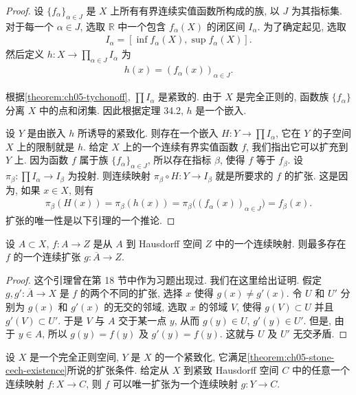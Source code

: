 \documentclass[../../main.tex]{subfiles}
\begin{document}
\begin{proof}
设 $\{f_\alpha\}_{\alpha\in J}$ 是 $X$ 上所有有界连续实值函数所构成的族, 以 $J$ 为其指标集. 对于每一个 $\alpha\in J$, 选取 $\mathbb{R}$ 中一个包含 $f_\alpha(X)$ 的闭区间 $I_\alpha$. 为了确定起见, 选取
\begin{align*}
I_\alpha=[\inf f_\alpha(X),\sup f_\alpha(X)].
\end{align*}
然后定义 $h\colon X\to\prod_{\alpha\in J}I_\alpha$ 为
\begin{align*}
h(x)=(f_\alpha(x))_{\alpha\in J}.
\end{align*}

根据\cref{theorem:ch05-tychonoff}, $\prod I_\alpha$ 是紧致的. 由于 $X$ 是完全正则的, 函数族 $\{f_\alpha\}$ 分离 $X$ 中的点和闭集. 因此根据定理 34.2, $h$ 是一个嵌入.

设 $Y$ 是由嵌入 $h$ 所诱导的紧致化. 则存在一个嵌入 $H\colon Y\to\prod I_\alpha$, 它在 $Y$ 的子空间 $X$ 上的限制就是 $h$. 给定 $X$ 上的一个连续有界实值函数 $f$, 我们指出它可以扩充到 $Y$ 上. 因为函数 $f$ 属于族 $\{f_\alpha\}_{\alpha\in J}$, 所以存在指标 $\beta$, 使得 $f$ 等于 $f_\beta$. 设 $\pi_\beta\colon\prod I_\alpha\to I_\beta$ 为投射. 则连续映射 $\pi_\beta\circ H\colon Y\to I_\beta$ 就是所要求的 $f$ 的扩张. 这是因为, 如果 $x\in X$, 则有
\begin{align*}
\pi_\beta(H(x))=\pi_\beta(h(x))=\pi_\beta\bigl((f_\alpha(x))_{\alpha\in J}\bigr)=f_\beta(x).
\end{align*}
扩张的唯一性是以下引理的一个推论.
\end{proof}

\begin{lemma}\label{lemma:ch05-extension-uniqueness}
设 $A\subset X$, $f\colon A\to Z$ 是从 $A$ 到 Hausdorff 空间 $Z$ 中的一个连续映射. 则最多存在 $f$ 的一个连续扩张 $g\colon\overline{A}\to Z$.
\end{lemma}

\begin{proof}
这个引理曾在第 18 节中作为习题出现过. 我们在这里给出证明. 假定 $g,g'\colon\overline{A}\to X$ 是 $f$ 的两个不同的扩张, 选择 $x$ 使得 $g(x)\neq g'(x)$. 令 $U$ 和 $U'$ 分别为 $g(x)$ 和 $g'(x)$ 的无交的邻域, 选取 $x$ 的邻域 $V$, 使得 $g(V)\subset U$ 并且 $g'(V)\subset U'$. 于是 $V$ 与 $A$ 交于某一点 $y$, 从而 $g(y)\in U$, $g'(y)\in U'$. 但是, 由于 $y\in A$, 所以 $g(y)=f(y)$ 及 $g'(y)=f(y)$. 这就与 $U$ 及 $U'$ 无交矛盾.
\end{proof}

\begin{theorem}\label{theorem:ch05-stone-cech-universal}
设 $X$ 是一个完全正则空间, $Y$ 是 $X$ 的一个紧致化, 它满足\cref{theorem:ch05-stone-cech-existence}所说的扩张条件. 给定从 $X$ 到紧致 Hausdorff 空间 $C$ 中的任意一个连续映射 $f\colon X\to C$, 则 $f$ 可以唯一扩张为一个连续映射 $g\colon Y\to C$.
\end{theorem}
\end{document}
